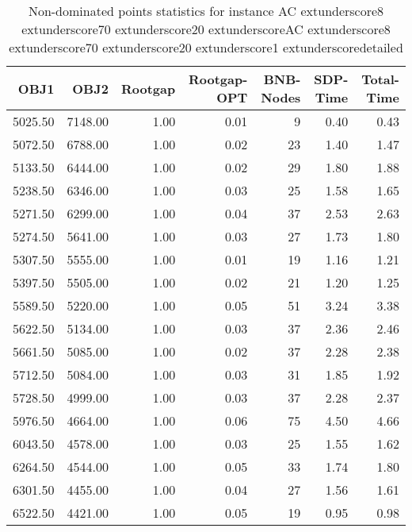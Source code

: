 \begin{table}
\caption{Non-dominated points statistics for instance AC	extunderscore8	extunderscore70	extunderscore20	extunderscoreAC	extunderscore8	extunderscore70	extunderscore20	extunderscore1	extunderscoredetailed}
\label{tab:stats/AC_8_70_20_AC_8_70_20_1_detailed}
\begin{tabular}{rrrrrrr}
\toprule
OBJ1 & OBJ2 & Rootgap & Rootgap-OPT & BNB-Nodes & SDP-Time & Total-Time \\
\midrule
5025.50 & 7148.00 & 1.00 & 0.01 & 9 & 0.40 & 0.43 \\
5072.50 & 6788.00 & 1.00 & 0.02 & 23 & 1.40 & 1.47 \\
5133.50 & 6444.00 & 1.00 & 0.02 & 29 & 1.80 & 1.88 \\
5238.50 & 6346.00 & 1.00 & 0.03 & 25 & 1.58 & 1.65 \\
5271.50 & 6299.00 & 1.00 & 0.04 & 37 & 2.53 & 2.63 \\
5274.50 & 5641.00 & 1.00 & 0.03 & 27 & 1.73 & 1.80 \\
5307.50 & 5555.00 & 1.00 & 0.01 & 19 & 1.16 & 1.21 \\
5397.50 & 5505.00 & 1.00 & 0.02 & 21 & 1.20 & 1.25 \\
5589.50 & 5220.00 & 1.00 & 0.05 & 51 & 3.24 & 3.38 \\
5622.50 & 5134.00 & 1.00 & 0.03 & 37 & 2.36 & 2.46 \\
5661.50 & 5085.00 & 1.00 & 0.02 & 37 & 2.28 & 2.38 \\
5712.50 & 5084.00 & 1.00 & 0.03 & 31 & 1.85 & 1.92 \\
5728.50 & 4999.00 & 1.00 & 0.03 & 37 & 2.28 & 2.37 \\
5976.50 & 4664.00 & 1.00 & 0.06 & 75 & 4.50 & 4.66 \\
6043.50 & 4578.00 & 1.00 & 0.03 & 25 & 1.55 & 1.62 \\
6264.50 & 4544.00 & 1.00 & 0.05 & 33 & 1.74 & 1.80 \\
6301.50 & 4455.00 & 1.00 & 0.04 & 27 & 1.56 & 1.61 \\
6522.50 & 4421.00 & 1.00 & 0.05 & 19 & 0.95 & 0.98 \\
\bottomrule
\end{tabular}
\end{table}
